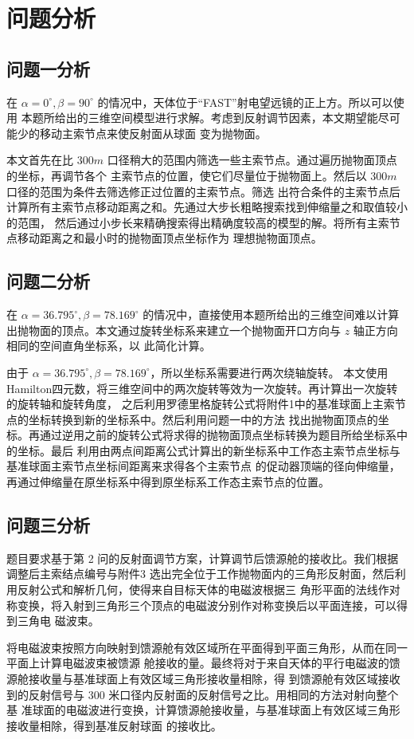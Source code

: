 \documentclass[withoutpreface,bwprint]{cumcmthesis} %
\begin{document}
\section{问题分析}
\subsection{问题一分析}
在 $\alpha = 0^\circ , \beta = 90^\circ$ 的情况中，天体位于“FAST”射电望远镜的正上方。所以可以使用
本题所给出的三维空间模型进行求解。考虑到反射调节因素，本文期望能尽可能少的移动主索节点来使反射面从球面
变为抛物面。

本文首先在比 $300m$ 口径稍大的范围内筛选一些主索节点。通过遍历抛物面顶点的坐标，再调节各个
主索节点的位置，使它们尽量位于抛物面上。然后以 $300m$ 口径的范围为条件去筛选修正过位置的主索节点。筛选
出符合条件的主索节点后计算所有主索节点移动距离之和。先通过大步长粗略搜索找到伸缩量之和取值较小的范围，
然后通过小步长来精确搜索得出精确度较高的模型的解。将所有主索节点移动距离之和最小时的抛物面顶点坐标作为
理想抛物面顶点。
\subsection{问题二分析}
在 $\alpha = 36.795^\circ , \beta = 78.169^\circ$ 的情况中，直接使用本题所给出的三维空间难以计算
出抛物面的顶点。本文通过旋转坐标系来建立一个抛物面开口方向与 $z$ 轴正方向相同的空间直角坐标系，以
此简化计算。

由于 $\alpha = 36.795^\circ , \beta = 78.169^\circ$，所以坐标系需要进行两次绕轴旋转。
本文使用Hamilton四元数，将三维空间中的两次旋转等效为一次旋转。再计算出一次旋转的旋转轴和旋转角度，
之后利用罗德里格旋转公式将附件1中的基准球面上主索节点的坐标转换到新的坐标系中。然后利用问题一中的方法
找出抛物面顶点的坐标。再通过逆用之前的旋转公式将求得的抛物面顶点坐标转换为题目所给坐标系中的坐标。最后
利用由两点间距离公式计算出的新坐标系中工作态主索节点坐标与基准球面主索节点坐标间距离来求得各个主索节点
的促动器顶端的径向伸缩量，再通过伸缩量在原坐标系中得到原坐标系工作态主索节点的位置。
\subsection{问题三分析}
题目要求基于第 2 问的反射面调节方案，计算调节后馈源舱的接收比。我们根据调整后主索结点编号与附件3
选出完全位于工作抛物面内的三角形反射面，然后利用反射公式和解析几何，使得来自目标天体的电磁波根据三
角形平面的法线作对称变换，将入射到三角形三个顶点的电磁波分别作对称变换后以平面连接，可以得到三角电
磁波束。

将电磁波束按照方向映射到馈源舱有效区域所在平面得到平面三角形，从而在同一平面上计算电磁波束被馈源
舱接收的量。最终将对于来自天体的平行电磁波的馈源舱接收量与基准球面上有效区域三角形接收量相除，得
到馈源舱有效区域接收到的反射信号与 $300$ 米口径内反射面的反射信号之比。用相同的方法对射向整个基
准球面的电磁波进行变换，计算馈源舱接收量，与基准球面上有效区域三角形接收量相除，得到基准反射球面
的接收比。
\end{document}
